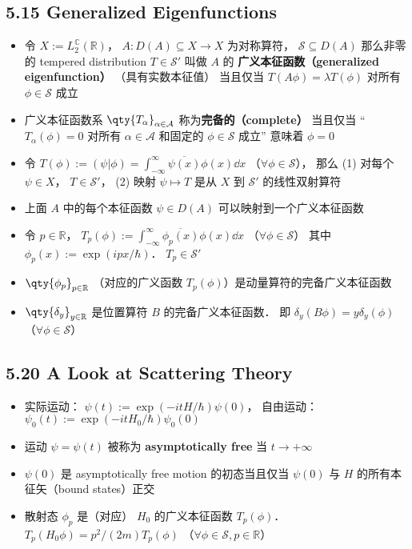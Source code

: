 \subsection{5.15 Generalized Eigenfunctions}
\begin{itemize}
\item 令 $X := L_2^{\mathbb C}(\mathbb R)$， $A:D(A) \subseteq X\to X$ 为对称算符， $\mathcal S\subseteq D(A)$ 那么非零的 tempered distribution $T \in\mathcal S'$ 叫做 $A$ 的 \textbf{广义本征函数（generalized eigenfunction）} （具有实数本征值） 当且仅当 $T(A\phi) = \lambda T(\phi)$ 对所有 $\phi\in\mathcal S$ 成立

\item 广义本征函数系 $\qty{T_\alpha}_{\alpha\in\mathcal A}$ 称为\textbf{完备的（complete）} 当且仅当 “$T_\alpha(\phi) = 0$ 对所有 $\alpha\in\mathcal A$ 和固定的 $\phi\in\mathcal S$ 成立” 意味着 $\phi = 0$

\item 令 $T(\phi) := (\psi|\phi) = \int_{-\infty}^\infty \overline{\psi(x)} \phi(x) \dd{x}$ （$\forall \phi\in\mathcal S$）， 那么 (1) 对每个 $\psi\in X$， $T\in\mathcal S'$， (2) 映射 $\psi\mapsto T$ 是从 $X$ 到 $\mathcal S'$ 的线性双射算符

\item 上面 $A$ 中的每个本征函数 $\psi\in D(A)$ 可以映射到一个广义本征函数

\item 令 $p\in\mathbb R$， $T_p(\phi) := \int_{-\infty}^\infty \overline{\phi_p(x)}\phi(x) \dd{x}$ （$\forall \phi\in\mathcal S$） 其中 $\phi_p(x) := \exp(ipx/\hbar)$． $T_p \in \mathcal S'$

\item $\qty{\phi_p}_{p\in\mathbb R}$ （对应的广义函数 $T_p(\phi)$）是动量算符的完备广义本征函数

\item $\qty{\delta_y}_{y\in\mathbb R}$ 是位置算符 $B$ 的完备广义本征函数． 即 $\delta_y(B\phi) = y\delta_y(\phi)$ （$\forall \phi\in\mathcal S$）
\end{itemize}

\subsection{5.20 A Look at Scattering Theory}
\begin{itemize}
\item 实际运动： $\psi(t) := \exp(-itH/\hbar)\psi(0)$， 自由运动： $\psi_0(t) := \exp(-itH_0/\hbar)\psi_0(0)$
\item 运动 $\psi = \psi(t)$ 被称为 \textbf{asymptotically free} 当 $t\to+\infty$

\item $\psi(0)$ 是 asymptotically free motion 的初态当且仅当 $\psi(0)$ 与 $H$ 的所有本征矢（bound states）正交

\item 散射态 $\phi_p$ 是（对应） $H_0$ 的广义本征函数 $T_p(\phi)$． $T_p(H_0 \phi) = p^2/(2m) T_p(\phi)$ （$\forall \phi\in\mathcal S, p\in\mathbb R$）
\end{itemize}

